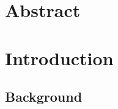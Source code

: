 \documentclass[letterpage, 11pt]{report}
\begin{document}



\tableofcontents


\chapter{Abstract}\label{chapter:abstract}


\chapter{Introduction}\label{chapter:introduction}
\setcounter{page}{1}
\onehalfspacing

\section{Background}


\lipsum[1]
\lipsum[2]
\lipsum[3]\cite{10.7551/mitpress/8551.001.0001}

\lipsum[1]
\lipsum[2]
\lipsum[3]

\printbibliography
\end{document}
